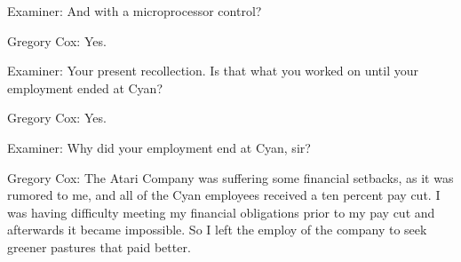 \textcolor{interviewer}{Examiner:} And with a microprocessor control? 

\textcolor{interviewee}{Gregory Cox:} Yes. 

\textcolor{interviewer}{Examiner:} Your present recollection. Is that what you worked on until your employment ended at Cyan? 

\textcolor{interviewee}{Gregory Cox:} Yes. 

\textcolor{interviewer}{Examiner:} Why did your employment end at Cyan, sir? 

\textcolor{interviewee}{Gregory Cox:} The Atari Company was suffering some financial setbacks, as it was rumored to me, and all of the Cyan employees received a ten percent pay cut. I was having difficulty meeting my financial obligations prior to my pay cut and afterwards it became impossible. So I left the employ of the company to seek greener pastures that paid better.
